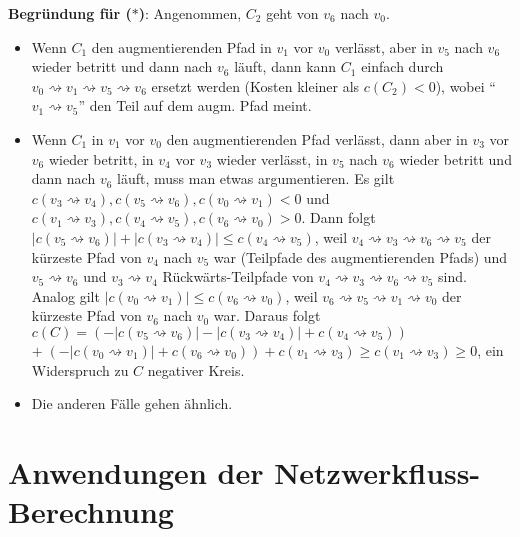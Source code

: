 \textbf{Begründung für ($\ast$)}:
Angenommen, $C_2$ geht von $v_6$ nach $v_0$.
\begin{itemize}
    \item
    Wenn $C_1$ den augmentierenden Pfad in $v_1$ vor $v_0$ verlässt, aber in $v_5$ nach $v_6$
    wieder betritt und dann nach $v_6$ läuft, dann kann $C_1$ einfach durch
    $v_0 \rightsquigarrow v_1 \rightsquigarrow v_5 \rightsquigarrow v_6$
    ersetzt werden (Kosten kleiner als $c(C_2) < 0$),
    wobei "`$v_1 \rightsquigarrow v_5$"' den Teil auf dem augm. Pfad meint.

    \item
    Wenn $C_1$ in $v_1$ vor $v_0$ den augmentierenden Pfad verlässt, dann aber in $v_3$ vor $v_6$
    wieder betritt, in $v_4$ vor $v_3$ wieder verlässt, in $v_5$ nach $v_6$ wieder betritt und
    dann nach $v_6$ läuft, muss man etwas argumentieren.
    Es gilt $c(v_3 \rightsquigarrow v_4), c(v_5 \rightsquigarrow v_6),
    c(v_0 \rightsquigarrow v_1) < 0$ und
    $c(v_1 \rightsquigarrow v_3), c(v_4 \rightsquigarrow v_5), c(v_6 \rightsquigarrow v_0) > 0$.
    Dann folgt $|c(v_5 \rightsquigarrow v_6)| + |c(v_3 \rightsquigarrow v_4)| \le
    c(v_4 \rightsquigarrow v_5)$, weil
    $v_4 \rightsquigarrow v_3 \rightsquigarrow v_6 \rightsquigarrow v_5$ der kürzeste Pfad von
    $v_4$ nach $v_5$ war (Teilpfade des augmentierenden Pfads)
    und $v_5 \rightsquigarrow v_6$ und $v_3 \rightsquigarrow v_4$ Rückwärts-Teilpfade von
    $v_4 \rightsquigarrow v_3 \rightsquigarrow v_6 \rightsquigarrow v_5$ sind.
    Analog gilt $|c(v_0 \rightsquigarrow v_1)| \le c(v_6 \rightsquigarrow v_0)$,
    weil $v_6 \rightsquigarrow v_5 \rightsquigarrow v_1 \rightsquigarrow v_0$ der kürzeste Pfad von
    $v_6$ nach $v_0$ war.
    Daraus folgt $c(C) =
    (-|c(v_5 \rightsquigarrow v_6)| - |c(v_3 \rightsquigarrow v_4)| +
    c(v_4 \rightsquigarrow v_5))$\\
    $+\; (-|c(v_0 \rightsquigarrow v_1)| + c(v_6 \rightsquigarrow v_0)) + c(v_1 \rightsquigarrow v_3)
    \ge c(v_1 \rightsquigarrow v_3) \ge 0$,
    ein Widerspruch zu $C$ negativer Kreis.

    \item
    Die anderen Fälle gehen ähnlich.
\end{itemize}

\section{%
    Anwendungen der Netzwerkfluss-Berechnung%
}

